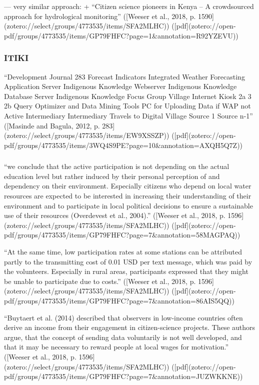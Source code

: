 ---
very similar approach:
+ “Citizen science pioneers in Kenya – A crowdsourced approach for hydrological monitoring” ([Weeser et al., 2018, p. 1590](zotero://select/groups/4773535/items/SFA2MLHC)) ([pdf](zotero://open-pdf/groups/4773535/items/GP79FHFC?page=1&annotation=R92YZEVU))

\subsubsection{ITIKI}
“Development Journal 283 Forecast Indicators Integrated Weather Forecasting Application Server Indigenous Knowledge Webserver Indigenous Knowledge Database Server Indigenous Knowledge Focus Group Village Internet Kiosk 2a 3 2b Query Optimizer and Data Mining Tools PC for Uploading Data if WAP not Active Intermediary Intermediary Travels to Digital Village Source 1 Source n-1” ([Masinde and Bagula, 2012, p. 283](zotero://select/groups/4773535/items/EW9XSSZP)) ([pdf](zotero://open-pdf/groups/4773535/items/3WQ4S9PE?page=10&annotation=AXQH5Q7Z))

\subsubsection{}


“we conclude that the active participation is not depending on the actual education level but rather induced by their personal perception of and dependency on their environment. Especially citizens who depend on local water resources are expected to be interested in increasing their understanding of their environment and to participate in local political decisions to ensure a sustainable use of their resources (Overdevest et al., 2004).” ([Weeser et al., 2018, p. 1596](zotero://select/groups/4773535/items/SFA2MLHC)) ([pdf](zotero://open-pdf/groups/4773535/items/GP79FHFC?page=7&annotation=58MAGPAQ))

“At the same time, low participation rates at some stations can be attributed partly to the transmitting cost of 0.01 USD per text message, which was paid by the volunteers. Especially in rural areas, participants expressed that they might be unable to participate due to costs.” ([Weeser et al., 2018, p. 1596](zotero://select/groups/4773535/items/SFA2MLHC)) ([pdf](zotero://open-pdf/groups/4773535/items/GP79FHFC?page=7&annotation=86AIS5QQ))

“Buytaert et al. (2014) described that observers in low-income countries often derive an income from their engagement in citizen-science projects. These authors argue, that the concept of sending data voluntarily is not well developed, and that it may be necessary to reward people at local wages for motivation.” ([Weeser et al., 2018, p. 1596](zotero://select/groups/4773535/items/SFA2MLHC)) ([pdf](zotero://open-pdf/groups/4773535/items/GP79FHFC?page=7&annotation=JUZWKKNE))

